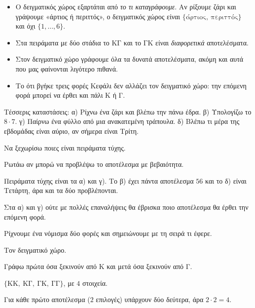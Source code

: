 \begin{prosoxi}
\begin{itemize}[leftmargin=1.2em,itemsep=0.3ex,topsep=2pt]
\item Ο δειγματικός χώρος εξαρτάται από \emph{το τι καταγράφουμε}. Αν ρίξουμε ζάρι και γράψουμε «άρτιος ή περιττός», ο δειγματικός χώρος είναι $\{\text{άρτιος},\ \text{περιττός}\}$ και όχι $\{1,\dots,6\}$.
\item Στα πειράματα με δύο στάδια το $\mathrm{ΚΓ}$ και το $\mathrm{ΓΚ}$ είναι \emph{διαφορετικά} αποτελέσματα.
\item Στον δειγματικό χώρο γράφουμε όλα τα δυνατά αποτελέσματα, ακόμη και αυτά που μας φαίνονται λιγότερο πιθανά.
\item Το ότι βγήκε τρεις φορές Κεφάλι δεν αλλάζει τον δειγματικό χώρο: την επόμενη φορά μπορεί να έρθει και πάλι Κ ή Γ.
\end{itemize}
\end{prosoxi}


\tixero Τέσσερις καταστάσεις: α) Ρίχνω ένα ζάρι και βλέπω την πάνω έδρα. β) Υπολογίζω το $8\cdot7$. γ) Παίρνω ένα φύλλο από μια ανακατεμένη τράπουλα. δ) Βλέπω τι μέρα της εβδομάδας είναι αύριο, αν σήμερα είναι Τρίτη.\par
\tithelo Να ξεχωρίσω ποιες είναι πειράματα τύχης.\par
\possindeo Ρωτάω αν μπορώ να προβλέψω το αποτέλεσμα με βεβαιότητα.\par
\apantisi Πειράματα τύχης είναι τα α) και γ). Το β) έχει πάντα αποτέλεσμα $56$ και το δ) είναι Τετάρτη, άρα και τα δύο προβλέπονται.\par
\elegxos Στα α) και γ) ούτε με πολλές επαναλήψεις θα έβρισκα ποιο αποτέλεσμα θα έρθει την επόμενη φορά.

\tixero Ρίχνουμε ένα νόμισμα δύο φορές και σημειώνουμε με τη σειρά τι έφερε.\par
\tithelo Τον δειγματικό χώρο.\par
\possindeo Γράφω πρώτα όσα ξεκινούν από Κ και μετά όσα ξεκινούν από Γ.\par
\apantisi $\{\mathrm{ΚΚ},\ \mathrm{ΚΓ},\ \mathrm{ΓΚ},\ \mathrm{ΓΓ}\}$, με $4$ στοιχεία.\par
\elegxos Για κάθε πρώτο αποτέλεσμα ($2$ επιλογές) υπάρχουν δύο δεύτερα, άρα $2\cdot2=4$.

